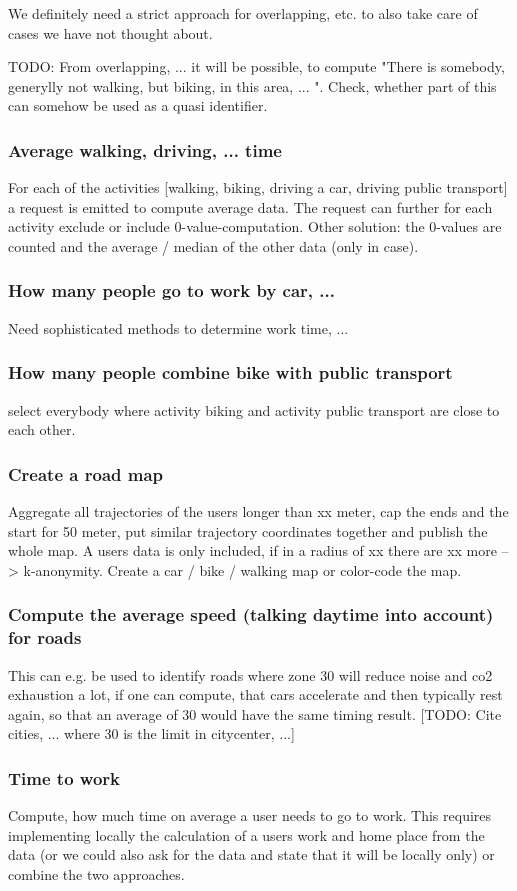 We definitely need a strict approach for overlapping, etc. to also take care of cases we have not thought about.

TODO: From overlapping, ... it will be possible, to compute "There is somebody, generylly not walking, but biking, in this area, ... ". Check, whether part of this can somehow be used as a quasi identifier.
\subsubsection{Average walking, driving, ... time}
For each of the activities [walking, biking, driving a car, driving public transport] a request is emitted to compute average data.
The request can further for each activity exclude or include 0-value-computation. Other solution: the 0-values are counted and the average / median of the other data (only in case).
\subsubsection{How many people go to work by car, ...}
Need sophisticated methods to determine work time, ... 
\subsubsection{How many people combine bike with public transport}
select everybody where activity biking and activity public transport are close to each other.
\subsubsection{Create a road map}
Aggregate all trajectories of the users longer than xx meter, cap the ends and the start for 50 meter, put similar trajectory coordinates together and publish the whole map.
A users data is only included, if in a radius of xx there are xx more --> k-anonymity.
Create a car / bike / walking map or color-code the map.
\subsubsection{Compute the average speed (talking daytime into account) for roads}
This can e.g. be used to identify roads where zone 30 will reduce noise and co2 exhaustion a lot, if one can compute, that cars accelerate and then typically rest again, so that an average of 30 would have the same timing result. [TODO: Cite cities, ... where 30 is the limit in citycenter, ...]
\subsubsection{Time to work}
Compute, how much time on average a user needs to go to work.
This requires implementing locally the calculation of a users work and home place from the data (or we could also ask for the data and state that it will be locally only) or combine the two approaches.
